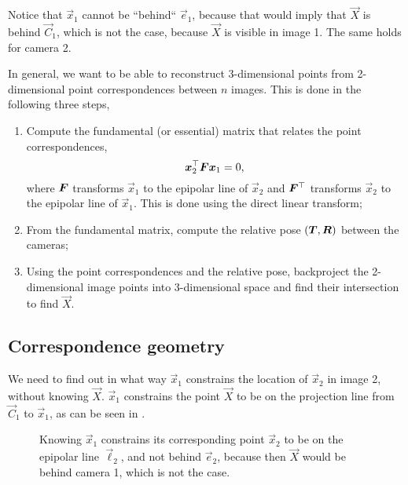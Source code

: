 Notice that $\vec{x}_1$ cannot be ``behind`` $\vec{e}_1$, because that would
imply that $\vec{X}$ is behind $\vec{C}_1$, which is not the case, because
$\vec{X}$ is visible in image 1. The same holds for camera 2.

In general, we want to be able to reconstruct 3-dimensional points from
2-dimensional point correspondences between $n$ images. This is done in the
following three steps,
\begin{enumerate}
    \item Compute the fundamental (or essential) matrix that relates the point
          correspondences, \[
              \bm{x}_2^\top \bm{F} \bm{x}_1 = 0
              ,\]
          where $\bm{F}$ transforms $\vec{x}_1$ to the epipolar line of $\vec{x}_2$
          and $\bm{F}^\top$ transforms $\vec{x}_2$ to the epipolar line of
          $\vec{x}_1$. This is done using the direct linear transform;

    \item From the fundamental matrix, compute the relative pose
          $(\bm{T},\bm{R})$ between the cameras;

    \item Using the point correspondences and the relative pose, backproject the
          2-dimensional image points into 3-dimensional space and find their
          intersection to find $\vec{X}$.

\end{enumerate}

\subsection{Correspondence geometry}

We need to find out in what way $\vec{x}_1$ constrains the location of
$\vec{x}_2$ in image 2, without knowing $\vec{X}$. $\vec{x}_1$ constrains the
point $\vec{X}$ to be on the projection line from $\vec{C}_1$ to $\vec{x}_1$,
as can be seen in .

\begin{figure}[ht]
    \centering
    \caption{Knowing $\vec{x}_1$ constrains its corresponding point $\vec{x}_2$
        to be on the epipolar line $\vec{\ell}_2$, and not behind $\vec{e}_2$,
        because then $\vec{X}$ would be behind camera 1, which is not the case.}
    \label{fig:image-1-constraint}
\end{figure}


